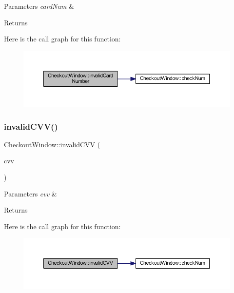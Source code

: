 \begin{DoxyParams}{Parameters}
{\em card\+Num} & \\
\hline
\end{DoxyParams}
\begin{DoxyReturn}{Returns}

\end{DoxyReturn}
Here is the call graph for this function\+:
\nopagebreak
\begin{figure}[H]
\begin{center}
\leavevmode
\includegraphics[width=350pt]{class_checkout_window_a28612fc41a4491136ae4327363cbeb74_cgraph}
\end{center}
\end{figure}
\mbox{\label{class_checkout_window_a5fab2958fac97a8a986065cb4ccf8d03}} 
\subsubsection{\texorpdfstring{invalid\+C\+V\+V()}{invalidCVV()}}
{\footnotesize\ttfamily Checkout\+Window\+::invalid\+C\+VV (\begin{DoxyParamCaption}\item[{Q\+String}]{cvv }\end{DoxyParamCaption})}


\begin{DoxyParams}{Parameters}
{\em cvv} & \\
\hline
\end{DoxyParams}
\begin{DoxyReturn}{Returns}

\end{DoxyReturn}
Here is the call graph for this function\+:
\nopagebreak
\begin{figure}[H]
\begin{center}
\leavevmode
\includegraphics[width=350pt]{class_checkout_window_a5fab2958fac97a8a986065cb4ccf8d03_cgraph}
\end{center}
\end{figure}


